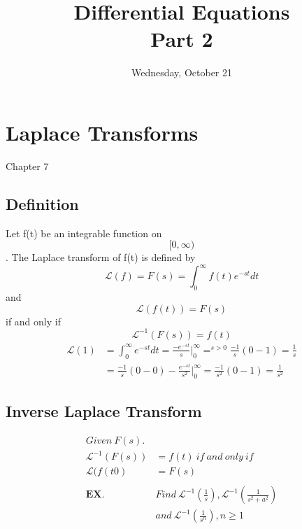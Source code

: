 \documentclass[10pt,a4paper]{article}
\begin{document}
\title{Differential Equations\\Part 2}
\date{}
\maketitle
\pagebreak
\date{Wednesday, October 21}
\section*{Laplace Transforms}
Chapter 7
\subsection*{Definition}
Let f(t) be an integrable function on\begin{equation} [0,\infty)\end{equation}. The Laplace transform of f(t) is defined by
\begin{equation}
\mathcal{L}(f)=F(s)=\int_{0}^{\infty}f(t)e^{-st}dt
\end{equation}
and
\begin{equation}
\mathcal{L}(f(t))=F(s)
\end{equation}
if and only if 
\begin{equation}
\mathcal{L}^{-1}(F(s))=f(t)
\end{equation}
\begin{align}
\mathcal{L}(1)&=\int _{0} ^{\infty} e^{-st}dt=\frac{-e^{-st}}{s}|_{0}^{\infty} =^{s>0} \frac{-1}{s}(0-1)=\frac{1}{s}\\
&=\frac{-1}{s}(0-0)-\frac{e^{-st}}{s^{2}}|_{0}^{\infty}=\frac{-1}{s^{2}}(0-1)=\frac{1}{s^{2}}
\end{align}
\subsection*{Inverse Laplace Transform}
\begin{align*}
Given\ F(s).\\
\mathcal{L}^{-1}(F(s))&=f(t)\ if\ and\ only\ if\\
\mathcal{L}(f(t0)&=F(s)\\\\
\textbf{EX.}\ &Find\ \mathcal{L}^{-1}(\frac{1}{s}), \mathcal{L}^{-1}(\frac{1}{s^{2}+a^{2}})\\
&and\ \mathcal{L}^{-1}(\frac{1}{s^{n}}), n\geq1
\end{align*}
\end{document}
